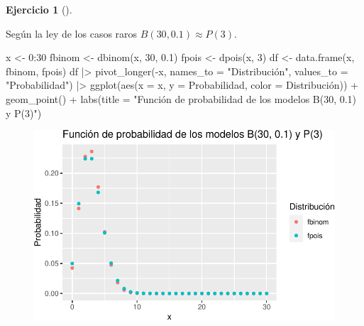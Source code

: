 \documentclass[
  a4paper,
]{scrreport}
\newenvironment{Shaded}{\begin{snugshade}}{\end{snugshade}}
\newcommand{\AttributeTok}[1]{\textcolor[rgb]{0.40,0.45,0.13}{#1}}
\newcommand{\DecValTok}[1]{\textcolor[rgb]{0.68,0.00,0.00}{#1}}
\newcommand{\FloatTok}[1]{\textcolor[rgb]{0.68,0.00,0.00}{#1}}
\newcommand{\FunctionTok}[1]{\textcolor[rgb]{0.28,0.35,0.67}{#1}}
\newcommand{\NormalTok}[1]{\textcolor[rgb]{0.00,0.23,0.31}{#1}}
\newcommand{\OtherTok}[1]{\textcolor[rgb]{0.00,0.23,0.31}{#1}}
\newcommand{\SpecialCharTok}[1]{\textcolor[rgb]{0.37,0.37,0.37}{#1}}
\newcommand{\StringTok}[1]{\textcolor[rgb]{0.13,0.47,0.30}{#1}}
\theoremstyle{definition}
\newtheorem{exercise}{Ejercicio}[chapter]
\theoremstyle{remark}
\begin{document}
\begin{exercise}[]
\begin{enumerate}
\begin{tcolorbox}
  Según la ley de los casos raros \(B(30, 0.1) \approx P(3)\).

\begin{Shaded}
\begin{Highlighting}[]
\NormalTok{x }\OtherTok{\textless{}{-}} \DecValTok{0}\SpecialCharTok{:}\DecValTok{30}
\NormalTok{fbinom }\OtherTok{\textless{}{-}} \FunctionTok{dbinom}\NormalTok{(x, }\DecValTok{30}\NormalTok{, }\FloatTok{0.1}\NormalTok{)}
\NormalTok{fpois }\OtherTok{\textless{}{-}} \FunctionTok{dpois}\NormalTok{(x, }\DecValTok{3}\NormalTok{)}
\NormalTok{df }\OtherTok{\textless{}{-}} \FunctionTok{data.frame}\NormalTok{(x, fbinom, fpois)}
\NormalTok{df  }\SpecialCharTok{|\textgreater{}} 
    \FunctionTok{pivot\_longer}\NormalTok{(}\SpecialCharTok{{-}}\NormalTok{x, }\AttributeTok{names\_to =} \StringTok{"Distribución"}\NormalTok{, }\AttributeTok{values\_to =} \StringTok{"Probabilidad"}\NormalTok{)  }\SpecialCharTok{|\textgreater{}} 
    \FunctionTok{ggplot}\NormalTok{(}\FunctionTok{aes}\NormalTok{(}\AttributeTok{x =}\NormalTok{ x, }\AttributeTok{y =}\NormalTok{ Probabilidad, }\AttributeTok{color =}\NormalTok{ Distribución)) }\SpecialCharTok{+} 
    \FunctionTok{geom\_point}\NormalTok{() }\SpecialCharTok{+}
    \FunctionTok{labs}\NormalTok{(}\AttributeTok{title =} \StringTok{"Función de probabilidad de los modelos B(30, 0.1) y P(3)"}\NormalTok{)}
\end{Highlighting}
\end{Shaded}

  \begin{figure}[H]

  {\centering \includegraphics{06-distribuciones-probabilidad_files/figure-pdf/unnamed-chunk-16-1.pdf}

  }


\end{figure}
\end{tcolorbox}
\end{enumerate}
\end{exercise}
\end{document}
